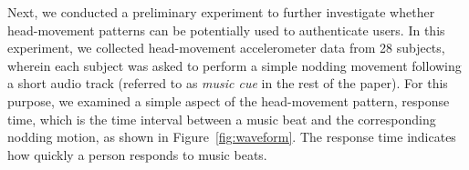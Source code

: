 Next, we conducted a preliminary experiment to further investigate whether head-movement patterns can be potentially used to authenticate users. In this experiment, we collected head-movement accelerometer data from 28 subjects, wherein each subject was asked to perform a simple nodding movement following a short audio track (referred to as \emph{music cue} in the rest of the paper).   For this purpose, we examined %
a simple aspect of the head-movement pattern, response time, which is the time interval between a music beat and the corresponding nodding motion, as shown in Figure~\ref{fig:waveform}. The response time indicates how quickly a person responds to music beats.
